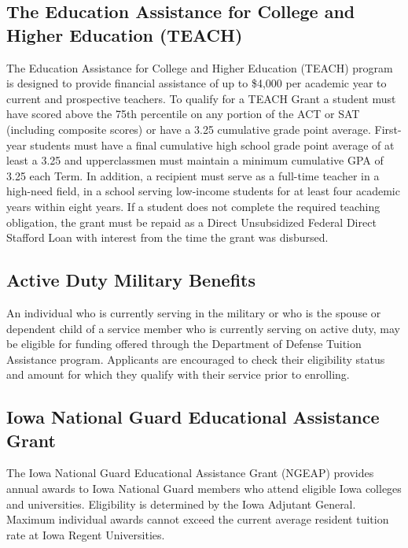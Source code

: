 \documentclass[
  letterpaper,
]{scrbook}
\begin{document}
\subsection{\texorpdfstring{\textbf{The Education Assistance for College
and Higher Education
(TEACH)}}{The Education Assistance for College and Higher Education (TEACH)}}\label{the-education-assistance-for-college-and-higher-education-teach}

The Education Assistance for College and Higher Education (TEACH)
program is designed to provide financial assistance of up to \$4,000 per
academic year to current and prospective teachers. To qualify for a
TEACH Grant a student must have scored above the 75th percentile on any
portion of the ACT or SAT (including composite scores) or have a 3.25
cumulative grade point average. First-year students must have a final
cumulative high school grade point average of at least a 3.25 and
upperclassmen must maintain a minimum cumulative GPA of 3.25 each Term.
In addition, a recipient must serve as a full-time teacher in a
high-need field, in a school serving low-income students for at least
four academic years within eight years. If a student does not complete
the required teaching obligation, the grant must be repaid as a Direct
Unsubsidized Federal Direct Stafford Loan with interest from the time
the grant was disbursed.

\subsection{\texorpdfstring{\textbf{Active Duty Military
Benefits}}{Active Duty Military Benefits}}\label{active-duty-military-benefits}

An individual who is currently serving in the military or who is the
spouse or dependent child of a service member who is currently serving
on active duty, may be eligible for funding offered through the
Department of Defense Tuition Assistance program. Applicants are
encouraged to check their eligibility status and amount for which they
qualify with their service prior to enrolling.

\subsection{\texorpdfstring{\textbf{Iowa National Guard Educational
Assistance
Grant}}{Iowa National Guard Educational Assistance Grant}}\label{iowa-national-guard-educational-assistance-grant}

The Iowa National Guard Educational Assistance Grant (NGEAP) provides
annual awards to Iowa National Guard members who attend eligible Iowa
colleges and universities. Eligibility is determined by the Iowa
Adjutant General. Maximum individual awards cannot exceed the current
average resident tuition rate at Iowa Regent Universities.
\end{document}
